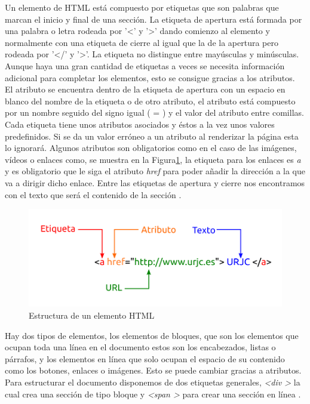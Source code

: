 Un elemento de HTML está compuesto por etiquetas que son palabras que marcan el inicio y final de una sección. La etiqueta de apertura está formada por una palabra o letra rodeada por '\textless' y '\textgreater' dando comienzo al elemento y normalmente con una etiqueta de cierre al igual que la de la apertura pero rodeada por '\textless/' y '\textgreater'. La etiqueta no distingue entre mayúsculas y minúsculas. Aunque haya una gran cantidad de etiquetas a veces se necesita información adicional para completar los elementos, esto se consigue gracias a los atributos.\\ 

El atributo se encuentra dentro de la etiqueta de apertura con un espacio en blanco del nombre de la etiqueta o de otro atributo, el atributo está compuesto por un nombre seguido del signo igual ( = ) y el valor del atributo entre comillas. \\

Cada etiqueta tiene unos atributos asociados y éstos a la vez unos valores predefinidos. Si se da un valor erróneo a un atributo al renderizar la página esta lo ignorará. Algunos atributos son obligatorios como en el caso de las imágenes, vídeos o enlaces como, se muestra en la Figura\ref{fig:elemento}, la etiqueta para los enlaces es \textit{a} y es obligatorio que le siga el atributo \textit{href}  para poder añadir la dirección a la que va a dirigir dicho enlace. Entre las etiquetas de apertura y cierre nos encontramos con el texto que será el contenido de la sección \cite{etiqueta}.

\begin{figure}[H]
    \centering
    \includegraphics[width=12cm, keepaspectratio]{img/elemento.png}
    \caption{Estructura de un elemento HTML}
    \label{fig:elemento}
\end{figure}

Hay dos tipos de elementos, los elementos de bloques, que son los elementos que ocupan toda una línea en el documento estos son los encabezados, listas o párrafos, y los elementos en línea que solo ocupan el espacio de su contenido como los botones, enlaces o imágenes. Esto se puede cambiar gracias a atributos. Para estructurar el documento disponemos de dos etiquetas generales, \textit{\textless div \textgreater} la cual crea una sección de tipo bloque y \textit{\textless span \textgreater} para crear una sección en línea \cite{juan2}.\\

